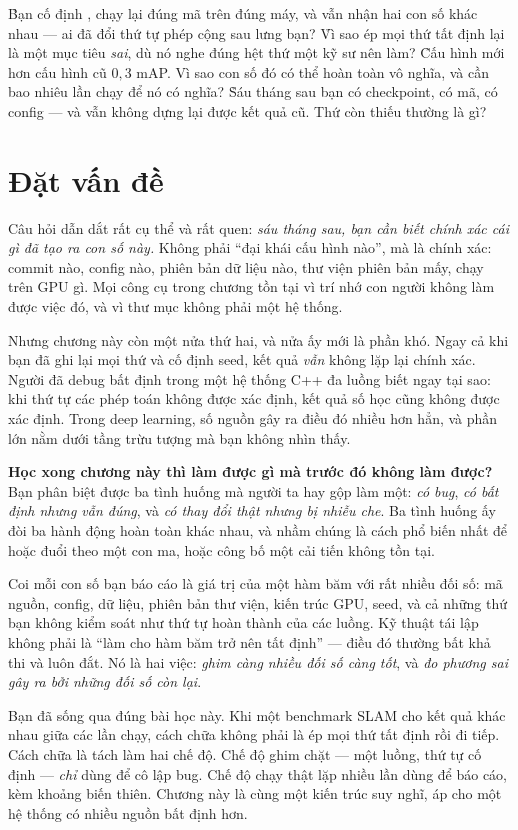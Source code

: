 \documentclass[../../deep_learning.tex]{subfiles}
\begin{document}
\begin{khoigoi}
\h{Bạn cố định , chạy lại đúng mã trên đúng máy, và vẫn nhận hai con số khác nhau --- ai đã đổi thứ tự phép cộng sau lưng bạn?}
\h{Vì sao ép mọi thứ tất định lại là một mục tiêu \emph{sai}, dù nó nghe đúng hệt thứ một kỹ sư nên làm?}
\h{Cấu hình mới hơn cấu hình cũ $0{,}3$ mAP. Vì sao con số đó có thể hoàn toàn vô nghĩa, và cần bao nhiêu lần chạy để nó có nghĩa?}
\h{Sáu tháng sau bạn có checkpoint, có mã, có config --- và vẫn không dựng lại được kết quả cũ. Thứ còn thiếu thường là gì?}
\end{khoigoi}

\section{Đặt vấn đề}
Câu hỏi dẫn dắt rất cụ thể và rất quen: \emph{sáu tháng sau, bạn cần biết chính xác cái gì đã tạo ra con số này.} Không phải ``đại khái cấu hình nào'', mà là chính xác: commit nào, config nào, phiên bản dữ liệu nào, thư viện phiên bản mấy, chạy trên GPU gì. Mọi công cụ trong chương tồn tại vì trí nhớ con người không làm được việc đó, và vì thư mục  không phải một hệ thống.

Nhưng chương này còn một nửa thứ hai, và nửa ấy mới là phần khó. Ngay cả khi bạn đã ghi lại mọi thứ và cố định seed, kết quả \emph{vẫn} không lặp lại chính xác. Người đã debug bất định trong một hệ thống C++ đa luồng biết ngay tại sao: khi thứ tự các phép toán không được xác định, kết quả số học cũng không được xác định. Trong deep learning, số nguồn gây ra điều đó nhiều hơn hẳn, và phần lớn nằm dưới tầng trừu tượng mà bạn không nhìn thấy.

\textbf{Học xong chương này thì làm được gì mà trước đó không làm được?} Bạn phân biệt được ba tình huống mà người ta hay gộp làm một: \emph{có bug}, \emph{có bất định nhưng vẫn đúng}, và \emph{có thay đổi thật nhưng bị nhiễu che}. Ba tình huống ấy đòi ba hành động hoàn toàn khác nhau, và nhầm chúng là cách phổ biến nhất để hoặc đuổi theo một con ma, hoặc công bố một cải tiến không tồn tại.

\begin{trucgiac}
Coi mỗi con số bạn báo cáo là giá trị của một hàm băm với rất nhiều đối số: mã nguồn, config, dữ liệu, phiên bản thư viện, kiến trúc GPU, seed, và cả những thứ bạn không kiểm soát như thứ tự hoàn thành của các luồng. Kỹ thuật tái lập không phải là ``làm cho hàm băm trở nên tất định'' --- điều đó thường bất khả thi và luôn đắt. Nó là hai việc: \emph{ghim càng nhiều đối số càng tốt}, và \emph{đo phương sai gây ra bởi những đối số còn lại}.

Bạn đã sống qua đúng bài học này. Khi một benchmark SLAM cho kết quả khác nhau giữa các lần chạy, cách chữa không phải là ép mọi thứ tất định rồi đi tiếp. Cách chữa là tách làm hai chế độ. Chế độ ghim chặt --- một luồng, thứ tự cố định --- \emph{chỉ} dùng để cô lập bug. Chế độ chạy thật lặp nhiều lần dùng để báo cáo, kèm khoảng biến thiên. Chương này là cùng một kiến trúc suy nghĩ, áp cho một hệ thống có nhiều nguồn bất định hơn.
\end{trucgiac}
\end{document}
